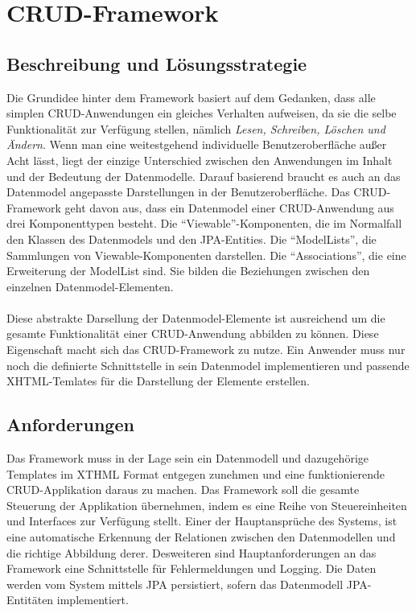 \chapter{CRUD-Framework}

\section{Beschreibung und Lösungsstrategie}
Die Grundidee hinter dem Framework basiert auf dem Gedanken, dass alle simplen \acs{CRUD}-Anwendungen ein gleiches Verhalten aufweisen, da sie die selbe Funktionalität
zur Verfügung stellen, nämlich \textit{Lesen, Schreiben, Löschen und Ändern}.
Wenn man eine weitestgehend individuelle Benutzeroberfläche außer Acht lässt, liegt der einzige Unterschied zwischen den Anwendungen im Inhalt und der Bedeutung der Datenmodelle.
Darauf basierend braucht es auch an das Datenmodel angepasste Darstellungen in der Benutzeroberfläche.
Das CRUD-Framework geht davon aus, dass ein Datenmodel einer \acs{CRUD}-Anwendung aus drei Komponenttypen besteht. 
Die \enquote{Viewable}-Komponenten, die im Normalfall den Klassen des Datenmodels und den JPA-Entities. 
Die \enquote{ModelLists}, die Sammlungen von Viewable-Komponenten darstellen. 
Die \enquote{Associations}, die eine Erweiterung der ModelList sind. Sie bilden die Beziehungen zwischen den einzelnen Datenmodel-Elementen.\\
\\
Diese abstrakte Darsellung der Datenmodel-Elemente ist ausreichend um die gesamte Funktionalität einer CRUD-Anwendung abbilden zu
können. Diese Eigenschaft macht sich das \acs{CRUD}-Framework zu nutze. Ein Anwender muss nur noch die definierte Schnittstelle in sein Datenmodel implementieren und 
passende XHTML-Temlates für die Darstellung der Elemente erstellen.

\section{Anforderungen}

Das Framework muss in der Lage sein ein Datenmodell und dazugehörige Templates im XTHML Format entgegen zunehmen und eine funktionierende
CRUD-Applikation daraus zu machen. Das Framework soll die gesamte Steuerung der Applikation übernehmen, indem es eine
Reihe von Steuereinheiten und Interfaces zur Verfügung stellt. Einer der Hauptansprüche des Systems, ist eine
automatische Erkennung der Relationen zwischen den Datenmodellen und die richtige Abbildung derer.
Desweiteren sind Hauptanforderungen an das Framework eine Schnittstelle für Fehlermeldungen und Logging. 
Die Daten werden vom System mittels JPA persistiert, sofern das Datenmodell JPA-Entitäten implementiert.

